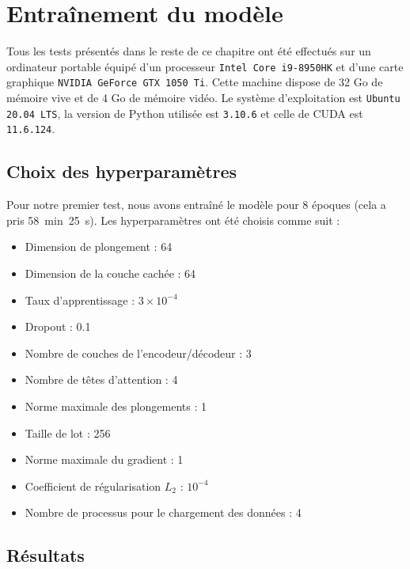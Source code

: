 \section{Entraînement du modèle}%
\label{sec.results.training}

Tous les tests présentés dans le reste de ce chapitre ont été effectués sur un ordinateur portable 
équipé d'un processeur \verb|Intel Core i9-8950HK| et d'une carte graphique \verb|NVIDIA GeForce GTX 1050 Ti|.
Cette machine dispose de 32 Go de mémoire vive et de 4 Go de mémoire vidéo.
Le système d'exploitation est \verb|Ubuntu 20.04 LTS|, 
la version de Python utilisée est \verb|3.10.6|
et celle de CUDA est \verb|11.6.124|.


\subsection{Choix des hyperparamètres}%
\label{sub.results.training.hyperparameters}

Pour notre premier test, nous avons entraîné le modèle pour 8 époques (cela a pris 58~min~25~s).
Les hyperparamètres ont été choisis comme suit :
\begin{itemize}
    \item Dimension de plongement : 64
    \item Dimension de la couche cachée : 64
    \item Taux d'apprentissage : \(3 \times 10^{-4}\)
    \item Dropout : 0.1
    \item Nombre de couches de l'encodeur/décodeur : 3
    \item Nombre de têtes d'attention : 4
    \item Norme maximale des plongements : 1
    \item Taille de lot : 256
    \item Norme maximale du gradient : 1
    \item Coefficient de régularisation \(L_2\) : \(10^{-4}\)
    \item Nombre de processus pour le chargement des données : 4
\end{itemize}


\subsection{Résultats}%
\label{sub.results.training.results}

